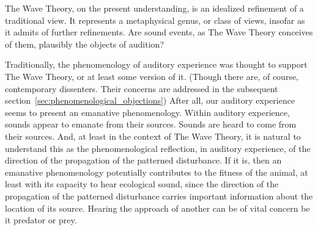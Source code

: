 The Wave Theory, on the present understanding, is an idealized refinement of a traditional view. It represents a metaphysical genus, or class of views, insofar as it admits of further refinements. Are sound events, as The Wave Theory conceives of them, plausibly the objects of audition?

Traditionally, the phenomenology of auditory experience was thought to support The Wave Theory, or at least some version of it. (Though there are, of course, contemporary dissenters. Their concerns are addressed in the subsequent section~\ref{sec:phenomenological_objections}) After all, our auditory experience seems to present an emanative phenomenology. Within auditory experience, sounds appear to emanate from their sources. Sounds are heard to come from their sources. And, at least in the context of The Wave Theory, it is natural to understand this as the phenomenological reflection, in auditory experience, of the direction of the propagation of the patterned disturbance. If it is, then an emanative phenomenology potentially contributes to the fitness of the animal, at least with its capacity to hear ecological sound, since the direction of the propagation of the patterned disturbance carries important information about the location of its source. Hearing the approach of another can be of vital concern be it predator or prey.

